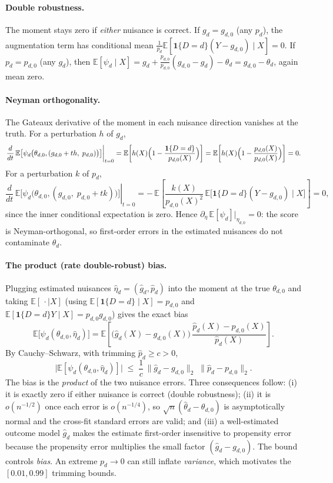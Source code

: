 \documentclass [11pt]{article}
\theoremstyle{plain}
\theoremstyle{definition}
\theoremstyle{remark}
\newcommand{\1}{\bm{1}}
\newcommand{\E}{\mathbb{E}}
\begin{document}
\begin{appendices}
\paragraph{Double robustness.} The moment stays zero if \emph{either} nuisance is correct. If \(g_d=g_{d,0}\) (any \(p_d\)), the augmentation term has conditional mean \(\tfrac{1}{p_d}\E[\mathbf 1\{D=d\}(Y-g_{d,0})\mid X]=0\). If \(p_d=p_{d,0}\) (any \(g_d\)), then \(\E[\psi_d\mid X]=g_d+\tfrac{p_{d,0}}{p_{d,0}}(g_{d,0}-g_d)-\theta_d=g_{d,0}-\theta_d\), again mean zero.

\paragraph{Neyman orthogonality.} The Gateaux derivative of the moment in each nuisance direction vanishes at the truth. For a perturbation \(h\) of \(g_d\),
\[
\left.\frac{d}{dt}\,\E\bigl[\psi_d\bigl(\theta_{d,0},(g_{d,0}+th,\;p_{d,0})\bigr)\bigr]\right|_{t=0}
=\E\!\left[h(X)\Bigl(1-\frac{\mathbf 1\{D=d\}}{p_{d,0}(X)}\Bigr)\right]
=\E\!\left[h(X)\Bigl(1-\frac{p_{d,0}(X)}{p_{d,0}(X)}\Bigr)\right]=0 .
\]
For a perturbation \(k\) of \(p_d\),
\[
\left.\frac{d}{dt}\,\E\bigl[\psi_d\bigl(\theta_{d,0},(g_{d,0},\;p_{d,0}+tk)\bigr)\bigr]\right|_{t=0}
=-\,\E\!\left[\frac{k(X)}{p_{d,0}(X)^2}\,\E\bigl[\mathbf 1\{D=d\}(Y-g_{d,0})\mid X\bigr]\right]=0,
\]
since the inner conditional expectation is zero. Hence \(\partial_\eta\,\E[\psi_d]\big|_{\eta_{d,0}}=0\): the score is Neyman-orthogonal, so first-order errors in the estimated nuisances do not contaminate \(\theta_{d}\).

\paragraph{The product (rate double-robust) bias.} Plugging estimated nuisances \(\hat\eta_d=(\hat g_d,\hat p_d)\) into the moment at the true \(\theta_{d,0}\) and taking \(\E[\,\cdot\mid X]\) (using \(\E[\mathbf 1\{D=d\}\mid X]=p_{d,0}\) and \(\E[\mathbf 1\{D=d\}Y\mid X]=p_{d,0}g_{d,0}\)) gives the exact bias
\[
\E\bigl[\psi_d(\theta_{d,0},\hat\eta_d)\bigr]
=\E\!\left[\bigl(\hat g_d(X)-g_{d,0}(X)\bigr)\,\frac{\hat p_d(X)-p_{d,0}(X)}{\hat p_d(X)}\right].
\]
By Cauchy--Schwarz, with trimming \(\hat p_d\ge c>0\),
\[
\bigl|\E[\psi_d(\theta_{d,0},\hat\eta_d)]\bigr|\;\le\;\frac1c\,\lVert \hat g_d-g_{d,0}\rVert_2\;\lVert \hat p_d-p_{d,0}\rVert_2 .
\]
The bias is the \emph{product} of the two nuisance errors. Three consequences follow: (i) it is exactly zero if either nuisance is correct (double robustness); (ii) it is \(o(n^{-1/2})\) once each error is \(o(n^{-1/4})\), so \(\sqrt n(\hat\theta_d-\theta_{d,0})\) is asymptotically normal and the cross-fit standard errors are valid; and (iii) a well-estimated outcome model \(\hat g_d\) makes the estimate first-order insensitive to propensity error because the propensity error multiplies the small factor \((\hat g_d-g_{d,0})\). The bound controls \emph{bias}. An extreme \(p_d\to 0\) can still inflate \emph{variance}, which motivates the \([0.01,0.99]\) trimming bounds.


\end{appendices}
\end{document}
